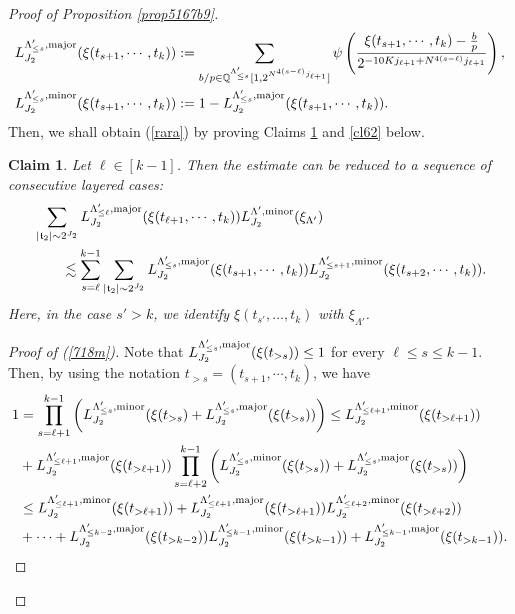 \documentclass[11 pt,letterpaper]{amsart}
\theoremstyle{plain}
\newtheorem{claim}{Claim}\numberwithin{claim}{section}
\theoremstyle{definition}
\theoremstyle{remark} \theoremstyle{exam} \theoremstyle{ob}
\numberwithin{equation}{section}
\begin{document}
\begin{proof}[Proof of Proposition \ref{prop5167b9}]
\begin{align*} 
 L^{\Lambda_{\le s}',\rm{major}}_{J_2}(\xi(t_{s+1},\cdots,t_k) )&:=\sum_{b/p\in \mathbb{Q}^{\Lambda'_{\le s}}[1,2^{N^{4(s-\ell)}j_{\ell+1}} ]}\psi\left(\frac{\xi(t_{s+1},\cdots,t_k)-\frac{b}{p}}{ 2^{-10Kj_{\ell+1} +N^{4 (s-\ell)}j_{\ell+1}} }\right),\\
 L^{\Lambda_{\le s}',\rm{minor}}_{J_2}(\xi(t_{s+1},\cdots,t_k) )&:= 1-L^{\Lambda_{\le s}',\rm{major}}_{J_2}(\xi(t_{s+1},\cdots,t_k) ).\nonumber
\end{align*}
Then, we shall obtain (\ref{rara}) by proving Claims \ref{cl61} and \ref{cl62} below.
\begin{claim}\label{cl61} Let $ \ell \in [k-1]$. Then the estimate can be reduced to a sequence of consecutive layered cases:
\begin{align} \label{718m}
& \sum_{|\mathfrak{t}_{2}|\sim 2^{J_2}}  
L^{\Lambda_{\le \ell}',\rm{major}}_{J_2}(\xi(t_{\ell+1},\cdots,t_k) )L^{\Lambda',\rm{minor}}_{J_2}(\xi_{\Lambda'}) \\
&\qquad\lesssim  \sum_{s=\ell}^{k-1}  \sum_{|\mathfrak{t}_2|\sim 2^{J_2}} L^{\Lambda_{\le s}',\rm{major}}_{J_2}(\xi(t_{s+1},\cdots,t_k) )L^{\Lambda_{\le s+1}',\rm{minor}}_{J_2}(\xi(t_{s+2},\cdots,t_k) ).\nonumber
\end{align} 
Here, in the case $s' > k$, we identify $\xi(t_{s'}, \ldots, t_k)$ with $\xi_{\Lambda'}$.  
\end{claim}
\begin{proof}[Proof of (\ref{718m})]
Note that  $L^{\Lambda_{\le s}',\rm{major}}_{J_2}(\xi(t_{>s}) )\le 1$ for every $\ell\le s\le k-1$. Then, by using the notation $t_{>s}=(t_{s+1},\cdots,t_k)$,  we have
\begin{align*}
1&=\prod_{s=\ell+1}^{k-1}\left(L^{\Lambda_{\le s}',\rm{minor}}_{J_2}(\xi(t_{>s}) +L^{\Lambda_{\le s}',\rm{major}}_{J_2}(\xi(t_{>s}) )\right)  \le  L^{\Lambda_{\le \ell+1}',\rm{minor}}_{J_2}(\xi(t_{>\ell+1}) )\\
&+L^{\Lambda_{\le \ell+1}',\rm{major}}_{J_2}(\xi(t_{>\ell+1}) )\prod_{s=\ell+2}^{k-1}\left(L^{\Lambda_{\le s}',\rm{minor}}_{J_2}(\xi(t_{>s}) )+ L^{\Lambda_{\le s}',\rm{major}}_{J_2}(\xi(t_{>s}) )\right)\\
&\le L^{\Lambda_{\le \ell+1}',\rm{minor}}_{J_2}(\xi(t_{>\ell+1}) )+ L^{\Lambda_{\le \ell+1}',\rm{major}}_{J_2}(\xi(t_{>\ell+1}) )L^{\Lambda_{\le \ell+2}',\rm{minor}}_{J_2}(\xi(t_{>\ell+2}) )\\
&+\cdots+ L^{\Lambda_{\le k-2}',\rm{major}}_{J_2}(\xi(t_{>k-2}) )L^{\Lambda_{\le k-1}',\rm{minor}}_{J_2}(\xi(t_{>k-1}) )+ L^{\Lambda_{\le k-1}',\rm{major}}_{J_2}(\xi(t_{>k-1}) ).

\end{align*}
\end{proof}
\end{proof}
\end{document}
